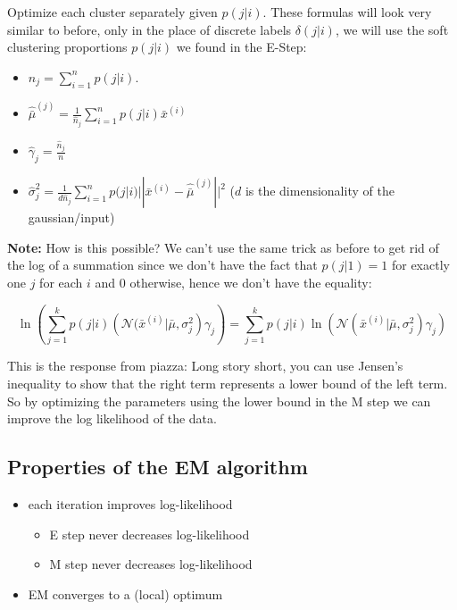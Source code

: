 \documentclass[12pt]{article}
\begin{document}
Optimize each cluster separately given $p(j|i)$. These formulas will look very similar to before, only in the place of discrete labels $\delta(j|i)$, we will use the soft clustering proportions $p(j|i)$ we found in the E-Step:

\begin{itemize}
	\item $\hat n_j = \sum_{i = 1}^n p(j|i)$. 
	\item $\hat{\bar{\mu}}^{(j)} = \frac 1 {\hat n_j} \sum_{i = 1}^n p(j|i) \bar x^{(i)}$
	\item $\hat{\gamma}_j = \frac {\hat n_j} n$
	\item $\hat{\sigma}_j^2 = \frac 1 {d \hat n_j} \sum_{i=1}^n p(j|i)||\bar x^{(i)} - \hat{\bar{\mu}}^{(j)}||^2$ \quad ($d$ is the dimensionality of the gaussian/input)
\end{itemize}


\textbf{Note:} How is this possible? We can't use the same trick as before to get rid of the log of a summation since we don't have the fact that $p(j|1) = 1$ for exactly one $j$ for each $i$ and 0 otherwise, hence we don't have the equality:

\[ \ln \left( \sum_{j=1}^k p(j|i)\left( \mathcal{N}(\bar x^{(i)} | \bar{\mu}, \sigma_j^2 \right)\gamma_j \right) = \sum_{j=1}^k p(j|i) \ln \left( \mathcal{N}(\bar x^{(i)} | \bar{\mu}, \sigma_j^2) \gamma_j \right) \]

This is the response from piazza: Long story short, you can use Jensen's inequality to show that the right term represents a lower bound of the left term. So by optimizing the parameters using the lower bound in the M step we can improve the log likelihood of the data.

\subsection{Properties of the EM algorithm}

\begin{itemize}
	\item each iteration improves log-likelihood
		\begin{itemize}
			\item E step never decreases log-likelihood
			\item M step never decreases log-likelihood
		\end{itemize}
	\item EM converges to a (local) optimum
\end{itemize}
\end{document}
